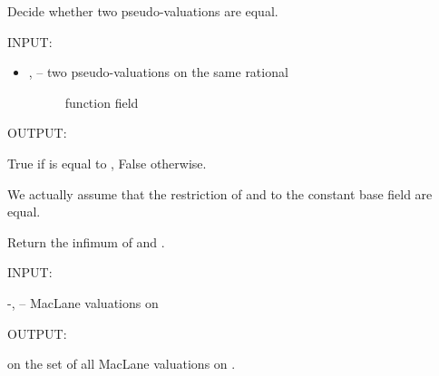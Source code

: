 \documentclass[letterpaper,10pt,english]{sphinxmanual}
\begin{document}
\begin{fulllineitems}
\label{berkovich_line:mclf.berkovich.berkovich_line.equality_of_pseudo_valuations}
Decide whether two pseudo-valuations are equal.

INPUT:
\begin{itemize}
\item {} \begin{description}
\item[{,  -- two pseudo-valuations on the same rational}] \leavevmode
function field 

\end{description}

\end{itemize}

OUTPUT:

True if  is equal to , False otherwise.

We actually assume that the restriction of  and  to the
constant base field are equal.

\end{fulllineitems}


\begin{fulllineitems}
\label{berkovich_line:mclf.berkovich.berkovich_line.mac_lane_infimum}
Return the infimum of  and .

INPUT:

-,  -- MacLane valuations on 

OUTPUT:

on the set of all MacLane valuations on .

\end{fulllineitems}

\end{document}
